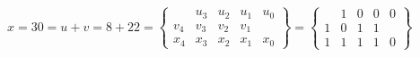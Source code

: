 \documentclass[twoside]{article}
\begin{document}
\begin{center}
\begin{figure}[tb!]
\begin{displaymath}
x = 30 = u+v = 8 + 22 = \left\{
\begin{array}{ccccc}
    & u_3 & u_2 & u_1 & u_0 \\
v_4 & v_3 & v_2 & v_1 &    \\
\hline
x_4 & x_3 & x_2 & x_1 & x_0
\end{array}
\right\}
=
\left\{
\begin{array}{ccccc}
    & 1 & 0 & 0 & 0 \\
  1 & 0 & 1 & 1 &   \\
\hline
1 & 1 & 1 & 1 & 0
\end{array}
\right\}
\end{displaymath}
\label{fig:csa-encoding}
\end{figure}
\end{center}
%
\end{document}
